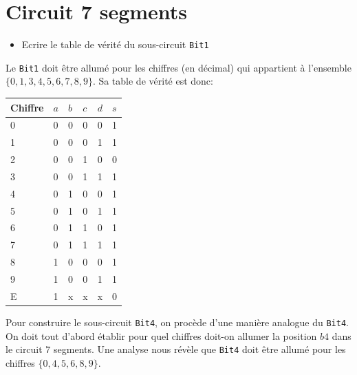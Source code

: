 \documentclass[10pt]{article} %
\begin{document}
\section{Circuit 7 segments}
\begin{itemize}
    \item [\ding{78}] Ecrire le table de vérité du sous-circuit \texttt{Bit1}
\end{itemize}

Le \texttt{Bit1} doit être allumé pour les chiffres (en décimal) qui appartient à l'ensemble $\{0, 1, 3, 4, 5, 6, 7, 8, 9\}$. Sa table de
vérité est donc:

\begin{table}[h!]
    \hspace{2cm}
    \begin{tabular}{l|llll |l}
    Chiffre & $a$ & $b$ & $c$ & $d$ & $s$ \\
    \hline
    0       & 0 & 0 & 0 & 0 & 1 \\
    1       & 0 & 0 & 0 & 1 & 1 \\
    2       & 0 & 0 & 1 & 0 & 0 \\
    3       & 0 & 0 & 1 & 1 & 1 \\
    4       & 0 & 1 & 0 & 0 & 1 \\
    5       & 0 & 1 & 0 & 1 & 1 \\
    6       & 0 & 1 & 1 & 0 & 1 \\
    7       & 0 & 1 & 1 & 1 & 1 \\
    8       & 1 & 0 & 0 & 0 & 1 \\
    9       & 1 & 0 & 0 & 1 & 1 \\
    E       & 1 & x & x & x & 0
    \end{tabular}
    \end{table}


Pour construire le sous-circuit \texttt{Bit4}, on procède d'une manière analogue du \texttt{Bit4}. On doit tout d'abord établir
pour quel chiffres doit-on allumer la position $b4$ dans le circuit 7 segments. Une analyse nous révèle que \texttt{Bit4} doit être allumé
pour les chiffres $\{0, 4, 5, 6, 8, 9\}$.

\newpage
\end{document}
